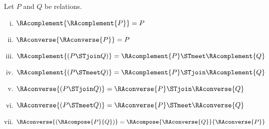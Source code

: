 \begin{proposition}
\label{prop:relationproperties}
	Let $P$ and $Q$ be relations.
	\begin{enumerate}[(i)]
		\item $\RAcomplement{\RAcomplement{P}} = P$
		\item $\RAconverse{\RAconverse{P}} = P$
		\item $\RAcomplement{(P \STjoin Q)} = \RAcomplement{P} \STmeet \RAcomplement{Q}$
		\item $\RAcomplement{(P \STmeet Q)} = \RAcomplement{P} \STjoin \RAcomplement{Q}$
		\item $\RAconverse{(P \STjoin Q)} = \RAconverse{P} \STjoin \RAconverse{Q}$
		\item $\RAconverse{(P \STmeet Q)} = \RAconverse{P} \STmeet \RAconverse{Q}$
		\item $\RAconverse{(\RAcompose{P}{Q})} = \RAcompose{\RAconverse{Q}}{\RAconverse{P}}$
	\end{enumerate}
\end{proposition}